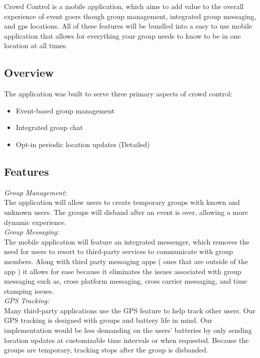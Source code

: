 Crowd Control is a mobile application, which aims to add value to the overall experience of event goers though group management, integrated group messaging, and gps locations. All of these features will be bundled into a easy to use mobile application that allows for everything your group needs to know to be in one location at all times.

\subsection{Overview}

The application was built to serve three primary aspects of crowd control: 
\begin{itemize}
\item Event-based group management
\item Integrated group chat
\item Opt-in periodic location updates
         (Detailed)
\end{itemize}

\subsection{Features}

\textit{Group Management:}\\
The application will allow users to create temporary groups with known and unknown users. The groups will disband after an event is over, allowing a more dynamic experience. \\


\textit{Group Messaging:} \\

The mobile application will feature an integrated messenger, which removes the need for users to resort to third-party services to communicate with group members. Along with third party messaging apps ( ones that are outside of the app ) it allows for ease because it eliminates the issues associated with group messaging such as, cross platform messaging, cross carrier messaging, and time stamping issues. \\

\textit{GPS Tracking:}\\

Many third-party applications use the GPS feature to help track other users. Our GPS tracking is designed with groups and battery life in mind. Our implementation would be less demanding on the users’ batteries by only sending location updates at customizable time intervals or when requested. Because the groups are temporary, tracking stops after the group is disbanded. \\






